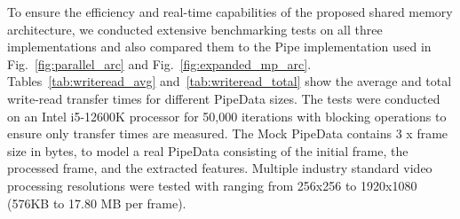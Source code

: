 \documentclass[conference]{IEEEtran}
\begin{document}
To ensure the efficiency and real-time capabilities of the proposed shared memory architecture, we conducted extensive benchmarking tests on all three implementations and also compared them to the Pipe implementation used in Fig.~\ref{fig:parallel_arc} and Fig.~\ref{fig:expanded_mp_arc}.
Tables~\ref{tab:writeread_avg} and~\ref{tab:writeread_total} show the average and total write-read transfer times for different PipeData sizes.
The tests were conducted on an Intel i5-12600K processor for 50,000 iterations with blocking operations to ensure only transfer times are measured.
The Mock PipeData contains 3 x frame size in bytes, to model a real PipeData consisting of the initial frame, the processed frame, and the extracted features.
Multiple industry standard video processing resolutions were tested with ranging from 256x256 to 1920x1080 (576KB to 17.80 MB per frame).

\begin{table}[h!]
\centering
\caption{Write-Read Average Transfer Time (ms) 50.000 iterations}
\label{tab:writeread_avg}
\end{table}

\begin{table}[h!]
\centering
\caption{Write-Read Total Transfer Time (s) 50.000 iterations}
\label{tab:writeread_total}
\end{table}
\end{document}

